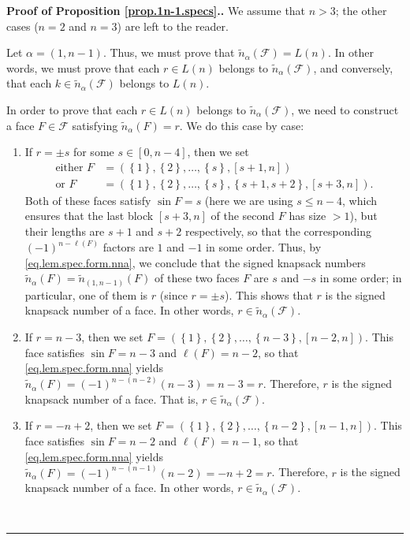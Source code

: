 \documentclass[12pt]{article}
\theoremstyle{definition}%
\theoremstyle{definition}%
\theoremstyle{remark}%
\newcommand{\tup}[1]{\left( #1 \right)}
\newcommand{\interval}[1]{\left[ #1 \right]} %
\newcommand{\set}[1]{\left\{ #1 \right\}}
\newcommand{\CF}{\mathcal{F}}
\newcommand{\nn}{\widetilde{n}}%
\newcommand{\nna}{\widetilde{n}_{ \alpha } }%
\newenvironment{proof}[1][Proof]{\noindent\textbf{#1.} }{\ \rule{0.5em}{0.5em}}
\begin{document}
\begin{proof}[Proof of Proposition \ref{prop.1n-1.specs}.]
We assume that $n>3$; the other cases ($n=2$ and $n=3$) are left to the reader.

Let $\alpha = \tup{1,n-1}$.
Thus, we must prove that
$\nna\tup{\CF} = L\tup{n}$.
In other words, we must prove that each
$r \in L\tup{n}$ belongs to $\nna\tup{\CF}$,
and conversely, that each
$k \in \nna\tup{\CF}$ belongs to $L\tup{n}$.

In order to prove that each $r \in L\tup{n}$ belongs to $\nna\tup{\CF}$, we
need to construct a face $F\in \CF$ satisfying $\nna \tup{F} = r$.
We do this case by case:

\begin{enumerate}
\item If $r = \pm s$ for some $s\in \interval{0, n-4}$, then we set
\begin{align*}
\text{either }F  & =\left(  \set{1} , \set{2},
\ldots, \set{s}  , \interval{s+1, n} \right)  \\
\text{or }F  & = \left(  \set{1} , \set{2},
\ldots, \set{s}  , \set{s+1, s+2} , \interval{s+3, n}
\right)  .
\end{align*}
Both of these faces satisfy $\sin F=s$ (here we are using $s\leq n-4$, which
ensures that the last block $\interval{s+3, n}$ of the second $F$ has
size $>1$), but their lengths are $s+1$ and $s+2$ respectively, so that the
corresponding $\tup{-1}^{n-\ell\tup{F} }$ factors are $1$
and $-1$ in some order. Thus, by \eqref{eq.lem.spec.form.nna}, we
conclude that the signed knapsack numbers
$\nna\tup{F} = \nn_{\tup{1, n-1}}\tup{F}$ of these two faces
$F$ are $s$ and $-s$ in some order; in particular, one of them is
$r$ (since $r = \pm s$).
This shows that $r$ is the signed knapsack number of a face.
In other words, $r \in \nna\tup{\CF}$.

\item If $r = n-3$, then we set $F = \left(  \set{1}, \set{2},
\ldots, \set{n-3}, \interval{n-2, n}  \right)  $.
This face satisfies $\sin F=n-3$ and $\ell\tup{F} =n-2$, so that
\eqref{eq.lem.spec.form.nna} yields
$\nna\tup{F} =\tup{-1}^{n-\tup{n-2}} \tup{n-3} = n-3 = r$.
Therefore, $r$ is the signed knapsack number of a face.
That is, $r \in \nna\tup{\CF}$.

\item If $r = -n+2$, then we set $F = \left(  \set{1}, \set{2},
\ldots, \set{n-2}, \interval{n-1, n}  \right)  $.
This face satisfies $\sin F=n-2$ and $\ell\tup{F} =n-1$, so that
\eqref{eq.lem.spec.form.nna} yields
$\nna\tup{F} =\tup{-1}^{n-\tup{n-1}} \tup{n-2} = -n+2 = r$.
Therefore, $r$ is the signed knapsack number of a face.
In other words, $r \in \nna\tup{\CF}$.


\end{enumerate}
\end{proof}
\end{document}
